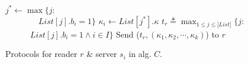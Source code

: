 \begin{algorithm}[!ht]
\begin{algorithmic}[3]
\begin{multicols}{2}
{           {
          \State $j^* \leftarrow \max \{j:$ 
          \\~~~~~~~~$ List[j].b_i = 1\}$
          \State ${\kappa}_i \leftarrow List[j^*].{\kappa}$
           \EndFor 
           \Statex
             \State  $t_r \triangleq \max_{1 \leq j \leq |List|} \{j:$ 
              \\~~~~~~$List[j].b_i = 1 \wedge i \in I\}$ 
            \State  Send  ($t_r, ({\kappa}_1,{\kappa}_2, \cdots, {\kappa}_k)$) to $r$
            }\EndPart       
          }\end{multicols}
        \end{algorithmic} 
        \caption{Protocols for reader $r$ \& server $s_i$ in alg. $C$.}\label{fig:algo_c}
          \vspace{-1.2em}
      \end{algorithm}


